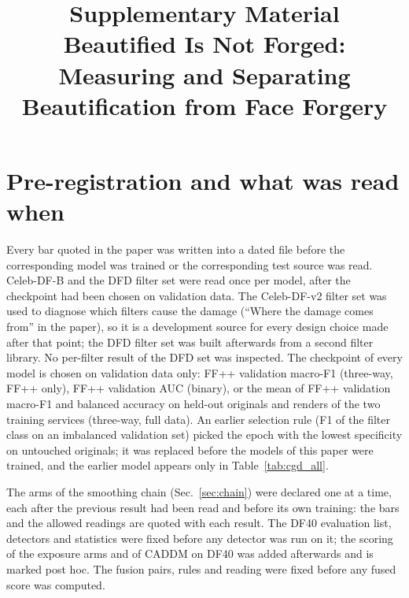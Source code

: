 \documentclass[10pt]{article}
\title{Supplementary Material\\Beautified Is Not Forged: Measuring and Separating Beautification from Face Forgery}
\author{}\date{}
\begin{document}
\maketitle

\section{Pre-registration and what was read when}
Every bar quoted in the paper was written into a dated file before the corresponding model was trained or the
corresponding test source was read. Celeb-DF-B and the DFD filter set were read once per model, after the checkpoint had
been chosen on validation data. The Celeb-DF-v2 filter set was used to diagnose which filters cause the damage
(``Where the damage comes from'' in the paper), so it is a development source for every design choice made after that point; the DFD filter set
was built afterwards from a second filter library. No per-filter result of the DFD set was inspected. The checkpoint of
every model is chosen on validation data only: FF++ validation macro-F1 (three-way, FF++ only), FF++ validation AUC
(binary), or the mean of FF++ validation macro-F1 and balanced accuracy on held-out originals and renders of the two
training services (three-way, full data). An earlier selection rule (F1 of the filter class on an imbalanced validation
set) picked the epoch with the lowest specificity on untouched originals; it was replaced before the models of this paper
were trained, and the earlier model appears only in Table~\ref{tab:cgd_all}.

The arms of the smoothing chain (Sec.~\ref{sec:chain}) were declared one at a time, each after the previous result had
been read and before its own training: the bars and the allowed readings are quoted with each result. The DF40
evaluation list, detectors and statistics were fixed before any detector was run on it; the scoring of the exposure arms
and of CADDM on DF40 was added afterwards and is marked post hoc. The fusion pairs, rules and reading were fixed before
any fused score was computed.
\end{document}
